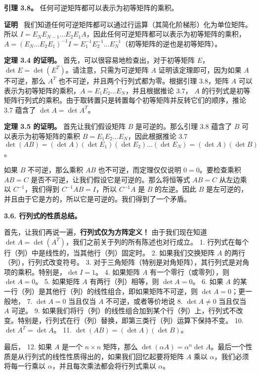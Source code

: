 \textbf{引理 3.8。} 任何可逆矩阵都可以表示为初等矩阵的乘积。

\textbf{证明}~ 我们知道任何可逆矩阵都可以通过行运算（其简化阶梯形）化为单位矩阵。所以 $I = E_N E_{N-1} \dots E_2 E_1 A$，因此任何可逆矩阵都可以表示为初等矩阵的乘积，$A = (E_N \dots E_2 E_1)^{-1} I = E_1^{-1} E_2^{-1} \dots E_N^{-1}$（初等矩阵的逆也是初等矩阵）。

\textbf{定理 3.4 的证明。} 首先，可以很容易地检查出，对于初等矩阵 $E$， $\det E = \det(E^T)$。请注意，只需为可逆矩阵 $A$ 证明该定理即可，因为如果 $A$ 不可逆，那么 $A^T$ 也不可逆，并且两个行列式都为零。根据引理 3.8，矩阵 $A$ 可以表示为初等矩阵的乘积，$A = E_1 E_2 \dots E_N$，并且根据推论 3.7， $A$ 的行列式是初等矩阵行列式的乘积。由于取转置只是转置每个初等矩阵并反转它们的顺序，推论 3.7 蕴含了 $\det A = \det A^T$。

\textbf{定理 3.5 的证明。} 首先让我们假设矩阵 $B$ 是可逆的。那么引理 3.8 蕴含了 $B$ 可以表示为初等矩阵的乘积 $B = E_1 E_2 \dots E_N$，因此根据推论 3.7 $\det(AB) = (\det A)(\det E_1)(\det E_2) \dots (\det E_N) = (\det A)(\det B)$。

如果 $B$ 不可逆，那么乘积 $AB$ 也不可逆，而定理仅仅说明 $0 = 0$。要检查乘积 $AB = C$ 是否不可逆，让我们假设它是可逆的。那么将恒等式 $AB = C$ 从左边乘以 $C^{-1}$，我们得到 $C^{-1} AB = I$，所以 $C^{-1} A$ 是 $B$ 的左逆。因此 $B$ 是左可逆的，并且由于它是方的，所以它是可逆的。我们得到了一个矛盾。

\textbf{3.6. 行列式的性质总结。}

首先，让我们再说一遍，\textbf{行列式仅为方阵定义！} 由于我们现在知道 $\det A = \det(A^T)$，我们之前关于列的所有陈述也对行成立。
1. 行列式在每个行（列）中是线性的，当其他行（列）固定时。
2. 如果我们交换矩阵 $A$ 的两行（列），行列式改变符号。
3. 对于三角矩阵（特别是对角矩阵），其行列式是对角项的乘积。特别是，$\det I = 1$。
4. 如果矩阵 $A$ 有一个零行（或零列），则 $\det A = 0$。
5. 如果矩阵 $A$ 有两行（列）相等，则 $\det A = 0$。
6. 如果 $A$ 的某一行（列）是其他行（列）的线性组合，即如果矩阵不可逆，则 $\det A = 0$；更一般地，
7. $\det A = 0$ 当且仅当 $A$ 不可逆，或者等价地说
8. $\det A \neq 0$ 当且仅当 $A$ 可逆。
9. 如果我们将行（列）的线性组合加到某个行（列）上，行列式不改变。特别是，行列式在行（列）替换，即第三类行（列）运算下保持不变。
10. $\det A^T = \det A$。
11. $\det(AB) = (\det A)(\det B)$。

最后，
12. 如果 $A$ 是一个 $n \times n$ 矩阵，那么 $\det( \alpha A ) = \alpha^n \det A$。最后一个性质是从行列式的线性性质得出的，如果我们回忆起要将矩阵 $A$ 乘以 $\alpha$，我们必须将每一行乘以 $\alpha$，并且每次乘法都会将行列式乘以 $\alpha$。

